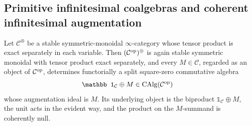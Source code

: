 \subsection{Primitive infinitesimal coalgebras and coherent infinitesimal augmentation}

\begin{lemma}
\label{lem:opposite-split-square-zero}
Let \(\mathcal C^\otimes\) be a stable symmetric-monoidal
\(\infty\)-category whose tensor product is exact separately in each variable.
Then \((\mathcal C^{\mathrm{op}})^\otimes\) is again stable symmetric monoidal with
tensor product exact separately, and every \(M\in\mathcal C\), regarded as an
object of \(\mathcal C^{\mathrm{op}}\), determines functorially a split square-zero
commutative algebra
\[
    \mathbb 1_{\mathcal C}\oplus M
    \in
    \CAlg(\mathcal C^{\op})
\]
whose augmentation ideal is \(M\). Its underlying object is the biproduct
\(\mathbb 1_{\mathcal C}\oplus M\), the unit acts in the evident way, and
the product on the \(M\)-summand is coherently null.
\end{lemma}

